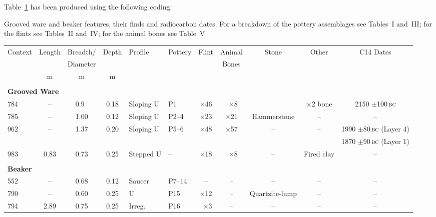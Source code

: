 Table~\ref{sideways} has been produced using the following coding:
%
\begin{smallverbatim}
\begin{table}
  \processtable
  {Grooved ware and beaker features, their finds and
    radiocarbon dates. For a breakdown of the pottery assemblages see
    Tables~I and~III; for the flints see Tables~II and~IV; for the animal
    bones see Table~V\label{sideways}}
  {\addtolength\tabcolsep{-2pt}
    \begin{tabular}{lcccllccccc}
    Context & Length & Breadth/  & Depth & Profile & Pottery & Flint & Animal
                                                     & Stone & Other & C14 Dates\\
    && Diameter &&&&& Bones\\[6pt]
    & m & m & m\\
    \hline\\[-5pt]
    \multicolumn{10}{l}{\textbf{Grooved Ware}}\\
    784 & --   & 0.9$\phantom{0}$ &0.18  & Sloping U & P1      & $\times$46
          & $\phantom{0}$$\times$8 && $\times$2 bone & 2150 $\pm$100\,\textsc{bc}\\
    785 & --   & 1.00             &0.12   & Sloping U & P2--4  & $\times$23
                                             & $\times$21 & Hammerstone & -- & --\\
    962 & --   & 1.37             &0.20   & Sloping U & P5--6  & $\times$48
                       & $\times$57 & --& --& 1990 $\pm$80\,\textsc{bc} (Layer 4)\\
    &&&&&&&&&& 1870 $\pm$90\,\textsc{bc} (Layer 1)\\
    983 & 0.83 & 0.73             &0.25   & Stepped U & --     & $\times$18
                                  & $\phantom{0}$$\times$8 & -- & Fired clay & --\\
    &&&&&&&&&&\\
    \multicolumn{10}{l}{\textbf{Beaker}}\\
    552 & --   & 0.68             & 0.12  & Saucer    & P7--14 & --           & --
                                                                     & -- &-- &--\\
    790 & --   & 0.60             & 0.25  & U         & P15    & $\times$12   & --
                                                        & Quartzite-lump & -- &--\\
    794 & 2.89 & 0.75             & 0.25  & Irreg.    & P16    & $\phantom{0}$$\times$3
                                                                & -- & -- &-- &--\\
    \end{tabular}}
\end{table}
\end{smallverbatim}

